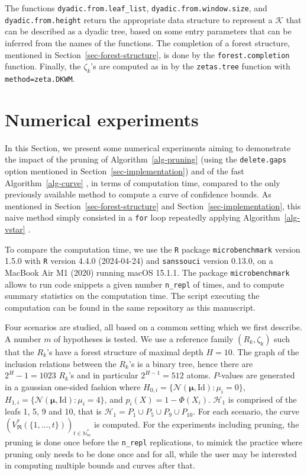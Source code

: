 \documentclass[
  11pt,
  a4paper,
]{article}
\theoremstyle{plain}
\theoremstyle{plain}
\theoremstyle{plain}
\theoremstyle{definition}
\theoremstyle{definition}
\theoremstyle{remark}
\begin{document}
The functions \texttt{dyadic.from.leaf\_list},
\texttt{dyadic.from.window.size}, and \texttt{dyadic.from.height} return
the appropriate data structure to represent a \(\mathcal{K}\) that can
be described as a dyadic tree, based on some entry parameters that can
be inferred from the names of the functions. The completion of a forest
structure, mentioned in Section~\ref{sec-forest-structure}, is done by
the \texttt{forest.completion} function. Finally, the \(\zeta_k\)'s are
computed as in \citet{MR4178188} by the \texttt{zetas.tree} function
with \texttt{method=zeta.DKWM}.

\section{Numerical experiments}\label{sec-numeric}

In this Section, we present some numerical experiments aiming to
demonstrate the impact of the pruning of  Algorithm~\ref{alg-pruning} 
(using the \texttt{delete.gaps} option mentioned in
Section~\ref{sec-implementation}) and of the fast
 Algorithm~\ref{alg-curve} , in terms of computation time, compared to
the only previously available method to compute a curve of confidence
bounds. As mentioned in Section~\ref{sec-forest-structure} and
Section~\ref{sec-implementation}, this naive method simply consisted in
a \texttt{for} loop repeatedly applying  Algorithm~\ref{alg-vstar} .

To compare the computation time, we use the \texttt{R} package
\texttt{microbenchmark} version 1.5.0 \citep{microbenchmark} with
\texttt{R} version 4.4.0 (2024-04-24) and \texttt{sanssouci} version
0.13.0, on a MacBook Air M1 (2020) running macOS 15.1.1. The package
\texttt{microbenchmark} allows to run code snippets a given number
\texttt{n\_repl} of times, and to compute summary statistics on the
computation time. The script executing the computation can be found in
the same repository as this manuscript.

Four scenarios are studied, all based on a common setting which we first
describe. A number \(m\) of hypotheses is tested. We use a reference
family \((R_k,\zeta_k)\) such that the \(R_k\)'s have a forest structure
of maximal depth \(H=10\). The graph of the inclusion relations between
the \(R_k\)'s is a binary tree, hence there are \(2^H-1=1023\) \(R_k\)'s
and in particular \(2^{H-1}=512\) atoms. \(P\)-values are generated in a
gaussian one-sided fashion where
\(H_{0,i}= \{ \mathcal N(\boldsymbol{\mu}, \mathrm{Id})  :\mu_i=0 \}\),
\(H_{1,i}=\{ \mathcal N(\boldsymbol{\mu}, \mathrm{Id}) :\mu_i=4 \}\),
and \(p_i(X)=1-\Phi(X_i)\). \(\mathcal{H}_1\) is comprised of the leafs
1, 5, 9 and 10, that is
\(\mathcal{H}_1=P_1\cup P_5\cup P_9\cup P_{10}\). For each scenario, the
curve
\(\left(V^*_{\mathfrak{R}}(\{1,\dotsc,t \})\right)_{t\in\mathbb{N}_m^*}\)
is computed. For the experiments including pruning, the pruning is done
once before the \texttt{n\_repl} replications, to mimick the practice
where pruning only needs to be done once and for all, while the user may
be interested in computing multiple bounds and curves after that.
\end{document}
